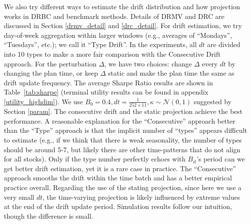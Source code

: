 \documentclass[11pt]{article}
\theoremstyle{definition}
\begin{document}
We also try different ways to estimate the drift distribution and how projection works in DRBC and benchmark methods. Details of DRMV and DRC are discussed in Section \ref{drmv_detail} and \ref{drc_detail}. For drift estimation, we try day-of-week aggregation within larger windows (e.g., averages of “Mondays”, “Tuesdays”, etc.); we call it “Type Drift”. In the experiments, all $dt$ are divided into 10 types to make a more fair comparison with the Consecutive Drift approach.  For the perturbation $\Delta$, we have two choices: change $\Delta$ every $dt$ by changing the plan time, or keep $\Delta$ static and make the plan time the same as drift update frequency. The average Sharpe Ratio results are shown in Table~\ref{tab:sharpe} (terminal utility results can be found in appendix \ref{utility_highdim}). We use $B_0=0.4, dt=\frac{1}{252 \times 11},\kappa\sim \mathcal{N}(0,1)$ suggested by Section \ref{param}. The consecutive drift and the static projection achieve the best performance. A reasonable explanation for the “Consecutive” approach better than the “Type” approach is that the implicit number of “types” appears difficult to estimate (e.g., if we think that there is weak seasonality, the number of types should be around 5-7, but likely there are other time-patterns that do not align for all stocks). Only if the type number perfectly echoes with $B_{it}$'s period can we get better drift estimation, yet it is a rare case in practice. The “Consecutive” approach smooths the drift within the time batch and has a better empirical practice overall. Regarding the use of the stating projection, since here we use a very small $dt$, the time-varying projection is likely influenced by extreme values at the end of the drift update period. Simulation results follow our intuition, though the difference is small. 
\end{document}
